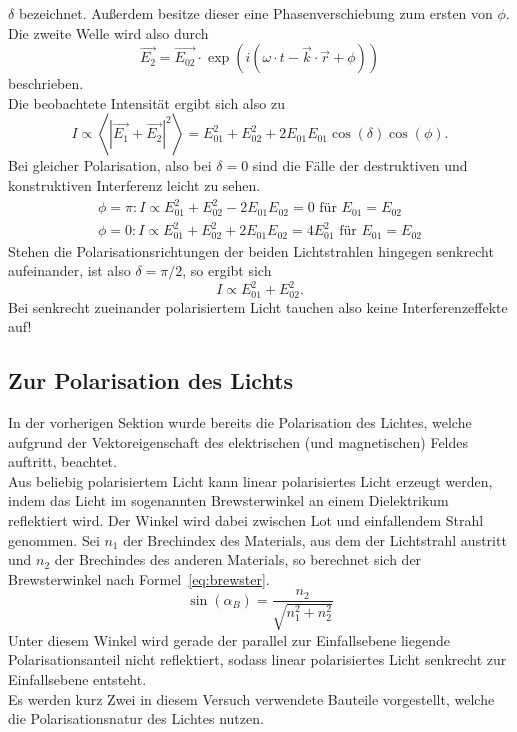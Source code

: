 $\delta$ bezeichnet.
Außerdem besitze dieser eine Phasenverschiebung zum ersten von 
$\phi$. Die zweite Welle wird also durch
\begin{equation}
\vec{E_2} = \vec{E_{02}}\cdot \exp{(i(\omega\cdot t - 
\vec{k}\cdot \vec{r} + \phi))}
\end{equation}
beschrieben.\\
Die beobachtete Intensität ergibt sich also zu
\begin{equation}
I \propto \left<\left|\vec{E_1}+\vec{E_2}\right|^2\right>
=E_{01}^2 + E_{02}^2 + 2E_{01}E_{01}\cos{(\delta)}\cos{(\phi)}.
\label{eq:intense}
\end{equation}
Bei gleicher Polarisation, also bei $\delta =0$ sind die Fälle der 
destruktiven und konstruktiven Interferenz leicht zu sehen.
\begin{align}
\phi = \pi : I\propto E_{01}^2 + E_{02}^2 - 2E_{01}E_{02} 
 = 0 \text{ für } E_{01}=E_{02}\\
\phi = 0 : I\propto E_{01}^2 + E_{02}^2 + 2E_{01}E_{02} 
 = 4E_{01}^2 \text{ für } E_{01}=E_{02}
\end{align}
Stehen die Polarisationsrichtungen der beiden Lichtstrahlen hingegen 
senkrecht aufeinander, ist also $\delta = \pi/2$, so ergibt sich
\begin{equation}
I \propto E_{01}^2 + E_{02}^2.
\end{equation}
Bei senkrecht zueinander polarisiertem Licht tauchen also keine 
Interferenzeffekte auf!
%
\subsection{Zur Polarisation des Lichts}
%
In der vorherigen Sektion wurde bereits die Polarisation des Lichtes, 
welche aufgrund der Vektoreigenschaft des elektrischen 
(und magnetischen) Feldes auftritt, beachtet.\\
Aus beliebig polarisiertem Licht kann linear polarisiertes Licht 
erzeugt werden, indem das Licht im sogenannten Brewsterwinkel 
an einem Dielektrikum reflektiert wird. Der Winkel wird dabei 
zwischen Lot und einfallendem Strahl genommen. Sei $n_1$ 
der Brechindex des Materials, aus dem der Lichtstrahl austritt und 
$n_2$ der Brechindes des anderen Materials, so berechnet sich der 
Brewsterwinkel nach Formel~\ref{eq:brewster}.
%
\begin{equation}
\sin{(\alpha_B)} = \frac{n_2}{\sqrt{n_1^2 + n_2^2}}
\label{eq:brewster}
\end{equation}
%
Unter diesem Winkel wird gerade der parallel zur Einfallsebene 
liegende Polarisationsanteil nicht reflektiert, sodass linear 
polarisiertes Licht senkrecht zur Einfallsebene entsteht.\\
Es werden kurz Zwei in diesem Versuch verwendete Bauteile 
vorgestellt, welche die Polarisationsnatur des Lichtes nutzen.
%
